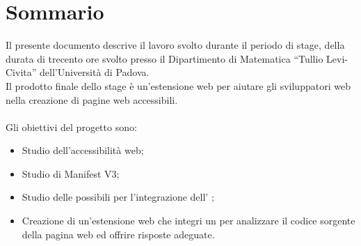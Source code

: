 \cleardoublepage
{}
{}
\begingroup
\let\clearpage\relax
\let\cleardoublepage\relax
\chapter*{Sommario}

\noindent Il presente documento descrive il lavoro svolto durante il periodo di stage, della durata di trecento ore svolto presso il Dipartimento di Matematica “Tullio Levi-Civita” dell’Università di Padova. \\
Il prodotto finale dello stage è un'estensione web  per aiutare gli sviluppatori web nella creazione di pagine web accessibili.\\
\\
Gli obiettivi del progetto sono:
\begin{itemize}
    \item Studio dell'accessibilità web;
    \item Studio di Manifest V3;
    \item Studio delle possibili  per l'integrazione dell' ;
    \item Creazione di un'estensione web che integri un   per analizzare il codice sorgente della pagina web ed offrire risposte adeguate.
\end{itemize}

\endgroup
\vfill